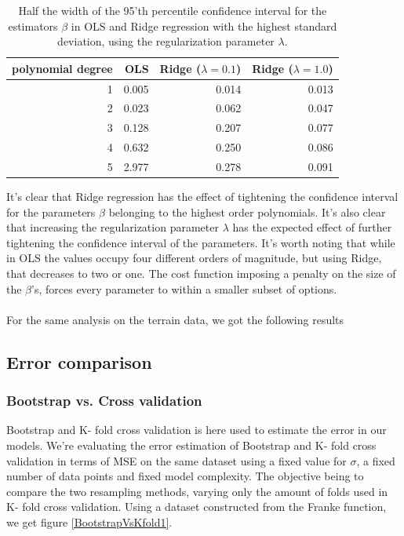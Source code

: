 \documentclass[11pt,a4paper,titlepage]{article}
\begin{document}
\begin{table}[H]\caption[Confidence interval of estimators in OLS vs. Ridge]{Half the width of the 95'th percentile confidence interval for the estimators $\beta$ in OLS and Ridge regression with the highest standard deviation, using the regularization parameter $\lambda$. }
\label{betaVarianceTable}
\begin{tabular}{|r|r|r|r|}
\hline
polynomial degree & OLS   & Ridge ($\lambda = 0.1$) & Ridge ($\lambda = 1.0$) \\ \hline
1                 & 0.005 & 0.014                & 0.013          \\
2                 & 0.023 & 0.062                & 0.047          \\
3                 & 0.128 & 0.207                & 0.077          \\
4                 & 0.632 & 0.250                & 0.086          \\
5                 & 2.977 & 0.278                & 0.091 \\ \hline
\end{tabular}
\end{table}
It's clear that Ridge regression has the effect of tightening the confidence interval for the parameters $\beta$ belonging to the highest order polynomials. It's also clear that increasing the regularization parameter $\lambda$ has the expected effect of further tightening the confidence interval of the parameters. It's worth noting that while in OLS the values occupy four different orders of magnitude, but using Ridge, that decreases to two or one. The cost function imposing a penalty on the size of the $\beta$'s, forces every parameter to within a smaller subset of options.\\\\ For the same analysis on the terrain data, we got the following results




\subsection{Error comparison}
\subsubsection{Bootstrap vs. Cross validation}
Bootstrap and K- fold cross validation is here used to estimate the error in our models. We're evaluating the error estimation of Bootstrap and K- fold cross validation in terms of MSE on the same dataset using a fixed value for $\sigma$, a fixed number of data points and fixed model complexity. The objective being to compare the two resampling methods, varying only the amount of folds used in K- fold cross validation. Using a dataset constructed from the Franke function, we get figure \ref{BootstrapVsKfold1}.
\end{document}
